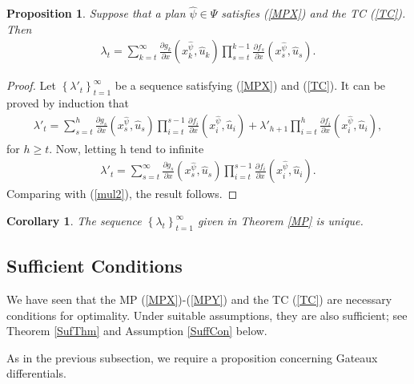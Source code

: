 \documentclass[3p]{elsarticle}
\newtheorem{prop}[thm]{Proposition}
\newtheorem{cor}[thm]{Corollary}
\begin{document}
	
	\begin{prop}\label{mul}
		Suppose that a plan $\hat\psi\in \Psi$ satisfies (\ref{MPX}) and the TC (\ref{TC}). Then 
		\begin{align}\label{mul2}
		\lambda_t=\sum_{k=t}^\infty\frac{\partial g_k}{\partial x}(x_k^{\hat{\psi}},\hat u_k)\prod_{s=t}^{k-1}\frac{\partial f_s}{\partial x}(x_s^{\hat{\psi}},\hat u_s).
		\end{align}
	\end{prop}
	\begin{proof}
		Let $\left\lbrace \lambda'_t\right\rbrace_{t=1}^\infty $ be a sequence satisfying (\ref{MPX}) and (\ref{TC}). It can be proved by induction that
		\begin{align*}
		\lambda'_t=\sum_{s=t}^{h}\frac{\partial g_s}{\partial x}(x_s^{\hat{\psi}},\hat u_s)\prod_{i=t}^{s-1}\frac{\partial f_i}{\partial x}(x_i^{\hat{\psi}},\hat u_i)+\lambda'_{h+1}\prod_{i=t}^{h}\frac{\partial f_i}{\partial x}(x_i^{\hat{\psi}},\hat u_i),
		\end{align*}
		for $h\ge t$. Now, letting h tend to infinite 
		\begin{align*}
		\lambda'_t=\sum_{s=t}^{\infty}\frac{\partial g_s}{\partial x}(x_s^{\hat{\psi}},\hat u_s)\prod_{i=t}^{s-1}\frac{\partial f_i}{\partial x}(x_i^{\hat{\psi}},\hat u_i).
		\end{align*}
		Comparing with (\ref{mul2}), the result follows.
	\end{proof}
	
	
	
	
	
	\begin{cor}\label{mulunique}
		The sequence $\left\lbrace \lambda_t\right\rbrace_{t=1}^\infty $ given in Theorem \ref{MP} is unique.
	\end{cor}
	
	
	\subsection{Sufficient Conditions}\label{SUFCON}
	
	We have seen that the MP (\ref{MPX})-(\ref{MPY}) and the TC (\ref{TC}) are necessary conditions for optimality. Under suitable assumptions, they are also sufficient; see Theorem  \ref{SufThm} and Assumption \ref{SuffCon} below.
	
	As in the previous subsection, we require a proposition concerning Gateaux differentials.
	
	
	
\end{document}
